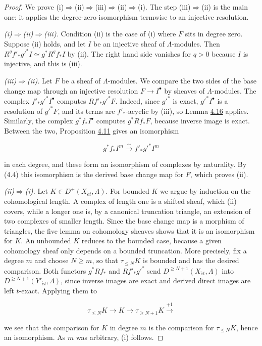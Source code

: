 \documentclass[11pt]{article}
\begin{document}
\begin{proof}[{Proof}]\label{bp46}%
We prove (i)\(\Rightarrow\)(ii)\(\Rightarrow\)(iii)\(\Rightarrow\)(ii)\(\Rightarrow\)(i). The step (iii)\(\Rightarrow\)(ii) is the main one: it applies the degree-zero isomorphism termwise to an injective resolution.

\emph{(i)\(\Rightarrow\)(ii)\(\Rightarrow\)(iii).} Condition (ii) is the case of (i) where \(F\) sits in degree zero. Suppose (ii) holds, and let \(I\) be an injective sheaf of \(\Lambda\)-modules. Then \(R^qf'_*g'^*I\simeq g^*R^qf_*I\) by (ii). The right hand side vanishes for \(q>0\) because \(I\) is injective, and this is (iii).

\emph{(iii)\(\Rightarrow\)(ii).} Let \(F\) be a sheaf of \(\Lambda\)-modules. We compare the two sides of the base change map through an injective resolution \(F\to I^\bullet\) by sheaves of \(\Lambda\)-modules. The complex \(f'_*g'^*I^\bullet\) computes \(Rf'_*g'^*F\). Indeed, since \(g'^*\) is exact, \(g'^*I^\bullet\) is a resolution of \(g'^*F\), and its terms are \(f'_*\)-acyclic by (iii), so Lemma \hyperref[bp42]{4.16} applies. Similarly, the complex \(g^*f_*I^\bullet\) computes \(g^*Rf_*F\), because inverse image is exact. Between the two, Proposition \hyperref[bp30]{4.11} gives an isomorphism

\[
g^*f_*I^m\xrightarrow{\sim} f'_*g'^*I^m
\]

in each degree, and these form an isomorphism of complexes by naturality. By (4.4) this isomorphism is the derived base change map for \(F\), which proves (ii).

\emph{(ii)\(\Rightarrow\)(i).} Let \(K\in D^+(X_{\acute{e}t},\Lambda)\). For bounded \(K\) we argue by induction on the cohomological length. A complex of length one is a shifted sheaf, which (ii) covers, while a longer one is, by a canonical truncation triangle, an extension of two complexes of smaller length. Since the base change map is a morphism of triangles, the five lemma on cohomology sheaves shows that it is an isomorphism for \(K\). An unbounded \(K\) reduces to the bounded case, because a given cohomology sheaf only depends on a bounded truncation. More precisely, fix a degree \(m\) and choose \(N\geq m\), so that \(\tau_{\leq N}K\) is bounded and has the desired comparison. Both functors \(g^*Rf_*\) and \(Rf'_*g'^*\) send \(D^{\geq N+1}(X_{\acute{e}t},\Lambda)\) into \(D^{\geq N+1}(Y'_{\acute{e}t},\Lambda)\), since inverse images are exact and derived direct images are left \(t\)-exact. Applying them to

\[
\tau_{\leq N}K\longrightarrow K\longrightarrow
\tau_{\geq N+1}K\xrightarrow{+1}
\]

we see that the comparison for \(K\) in degree \(m\) is the comparison for \(\tau_{\leq N}K\), hence an isomorphism. As \(m\) was arbitrary, (i) follows.
\end{proof}
\end{document}
